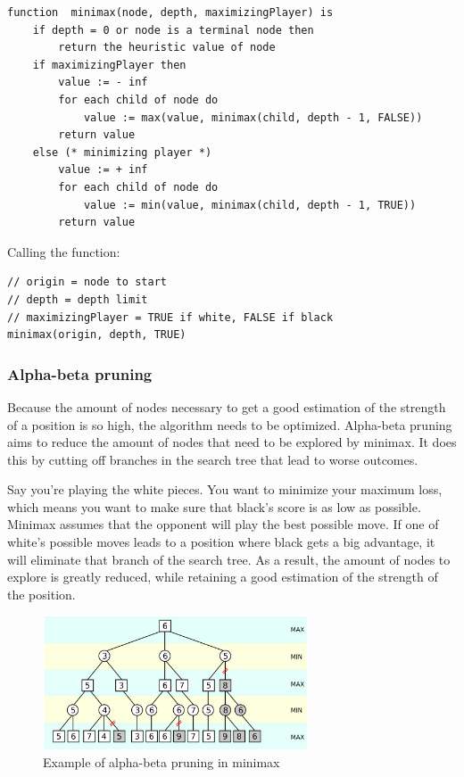 \documentclass{article}
\begin{document}
\begin{verbatim}
function  minimax(node, depth, maximizingPlayer) is
    if depth = 0 or node is a terminal node then
        return the heuristic value of node
    if maximizingPlayer then
        value := - inf
        for each child of node do
            value := max(value, minimax(child, depth - 1, FALSE))
        return value
    else (* minimizing player *)
        value := + inf
        for each child of node do
            value := min(value, minimax(child, depth - 1, TRUE))
        return value
\end{verbatim}

Calling the function:

\begin{verbatim}
// origin = node to start
// depth = depth limit
// maximizingPlayer = TRUE if white, FALSE if black
minimax(origin, depth, TRUE)
\end{verbatim}

\subsubsection{Alpha-beta pruning}

Because the amount of nodes necessary to get a good estimation of the strength of a position
is so high, the algorithm needs to be optimized. 
Alpha-beta pruning \cite{AlphaBetaPruning2022} aims to reduce the amount of nodes that need to be explored by minimax.
It does this by cutting off branches in the search tree that lead to worse outcomes.

Say you're playing the white pieces. You want to minimize your maximum loss, which means 
you want to make sure that black's score is as low as possible. 
Minimax assumes that the opponent will play the best possible move. If one of white's possible moves
leads to a position where black gets a big advantage, it will eliminate that branch of the search tree.
As a result, the amount of nodes to explore is greatly reduced, while retaining a good estimation 
of the strength of the position.

\begin{figure}[H]
    \centering
    \includegraphics[width=0.7\textwidth]{img/AB-pruning.png}
    \caption{Example of alpha-beta pruning in minimax}
\end{figure}
\end{document}
